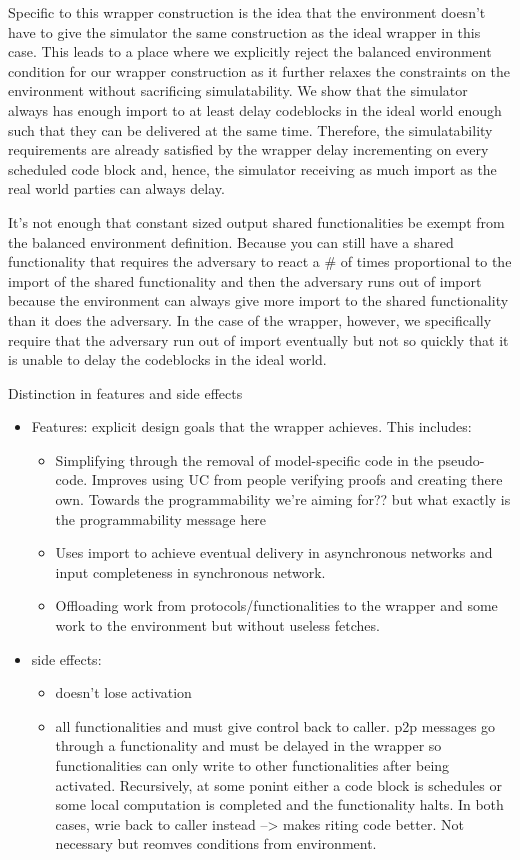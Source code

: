 Specific to this wrapper construction is the idea that the environment doesn’t have to give the simulator the same construction as the ideal wrapper in this case. 
This leads to a place where we explicitly reject the balanced environment condition for our wrapper construction as it further relaxes the constraints on the environment without sacrificing simulatability. 
We show that the simulator always has enough import to at least delay codeblocks in the ideal world enough such that they can be delivered at the same time. 
Therefore, the simulatability requirements are already satisfied by the wrapper delay incrementing on every scheduled code block and, hence, the simulator receiving as much import as the real world parties can always delay.

It’s not enough that constant sized output shared functionalities be exempt from the balanced environment definition. Because you can still have a shared functionality that requires the adversary to react a \# of times proportional to the import of the shared functionality and then the adversary runs out of import because the environment can always give more import to the shared functionality than it does the adversary.
In the case of the wrapper, however, we specifically require that the adversary run out of import eventually but not so quickly that it is unable to delay the codeblocks in the ideal world.



Distinction in features and side effects
\begin{itemize}
\item Features: explicit design goals that the wrapper achieves. This includes:
	\begin{itemize}
	\item Simplifying through the removal of model-specific code in the pseudo-code. Improves using UC from people verifying proofs and creating there own. Towards the programmability we're aiming for?? but what exactly is the programmability message here
	\item Uses import to achieve eventual delivery in asynchronous networks and input completeness in synchronous network.
	\item Offloading work from protocols/functionalities to the wrapper and some work to the environment but without useless fetches.
	\end{itemize}

\item side effects:
	\begin{itemize}
	\item doesn't lose activation
	\item all functionalities and must give control back to caller. p2p messages go through a functionality and must be delayed in the wrapper so functionalities can only write to other functionalities after being activated. Recursively, at some ponint either a code block is schedules or some local computation is completed and the functionality halts. In both cases, wrie back to caller instead --> makes riting code better. Not necessary but reomves conditions from environment.
	\end{itemize}
\end{itemize}



